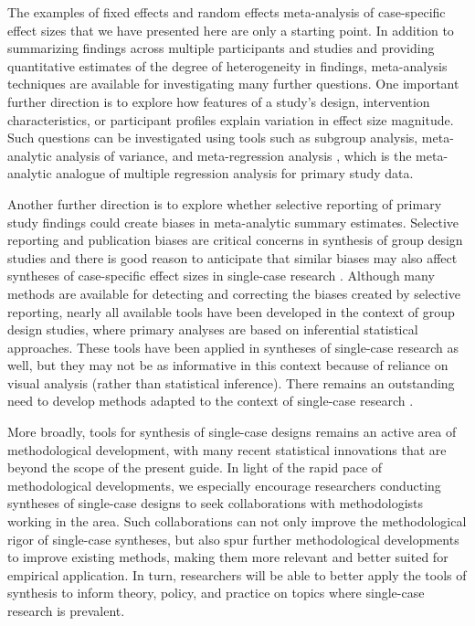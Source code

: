 \documentclass[
]{book}
\begin{document}
The examples of fixed effects and random effects meta-analysis of case-specific effect sizes that we have presented here are only a starting point. In addition to summarizing findings across multiple participants and studies and providing quantitative estimates of the degree of heterogeneity in findings, meta-analysis techniques are available for investigating many further questions. One important further direction is to explore how features of a study's design, intervention characteristics, or participant profiles explain variation in effect size magnitude. Such questions can be investigated using tools such as subgroup analysis, meta-analytic analysis of variance, and meta-regression analysis \citetext{\citealp[Chapters 19-21]{borenstein2021introduction}; \citealp{konstantopoulos2019statistically}; \citealp{Moeyaert_Yang_Xue_2023}}, which is the meta-analytic analogue of multiple regression analysis for primary study data.

Another further direction is to explore whether selective reporting of primary study findings could create biases in meta-analytic summary estimates. Selective reporting and publication biases are critical concerns in synthesis of group design studies \citep{rothstein2005publication} and there is good reason to anticipate that similar biases may also affect syntheses of case-specific effect sizes in single-case research \citep{Dowdy2020, Gage2017, Sham_Smith_2014, Shadish2016}. Although many methods are available for detecting and correcting the biases created by selective reporting, nearly all available tools have been developed in the context of group design studies, where primary analyses are based on inferential statistical approaches. These tools have been applied in syntheses of single-case research as well, but they may not be as informative in this context because of reliance on visual analysis (rather than statistical inference). There remains an outstanding need to develop methods adapted to the context of single-case research \citep{Dowdy2022, pustejovsky2017Research}.

More broadly, tools for synthesis of single-case designs remains an active area of methodological development, with many recent statistical innovations that are beyond the scope of the present guide. In light of the rapid pace of methodological developments, we especially encourage researchers conducting syntheses of single-case designs to seek collaborations with methodologists working in the area. Such collaborations can not only improve the methodological rigor of single-case syntheses, but also spur further methodological developments to improve existing methods, making them more relevant and better suited for empirical application. In turn, researchers will be able to better apply the tools of synthesis to inform theory, policy, and practice on topics where single-case research is prevalent.

  
\end{document}
